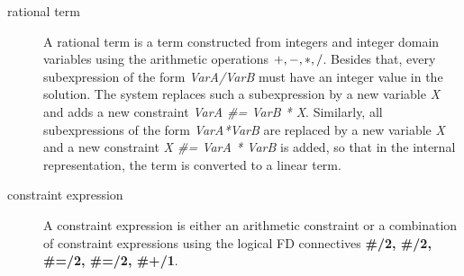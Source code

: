 \begin{description}
\item[rational term]
A rational term is a term constructed from integers and integer
domain variables using the arithmetic operations
${\bf +, -, *, /}$.
Besides that, every subexpression of the form {\it VarA/VarB} must have
an integer value in the solution.
The system replaces such a subexpression by a new variable {\it X}
and adds a new constraint {\it VarA \#= VarB * X}.
Similarly, all subexpressions of the form {\it VarA*VarB}
are replaced by a new variable {\it X}
and a new constraint {\it X \#= VarA * VarB} is added,
so that in the internal representation, the term is converted
to a linear term.

\item[constraint expression]
A constraint expression is either an arithmetic constraint
or a combination of constraint expressions using the
logical FD connectives
{\bf \#\andsy/2, \#\orsy/2, \#=\gt/2, \#\lt=\gt/2, \#\bsl+/1}.
\end{description}

